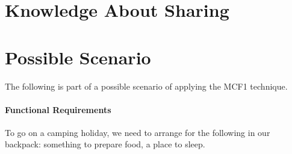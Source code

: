 \documentclass[a4paper,11pt]{article}
\begin{document}
\section*{Knowledge About Sharing}


\section*{Possible Scenario}

The following is part of a possible scenario of applying the
MCF1 technique.

\paragraph{Functional Requirements}

To go on a camping holiday, we need to arrange for the following
in our backpack: something to prepare food, a place to sleep.
\end{document}
